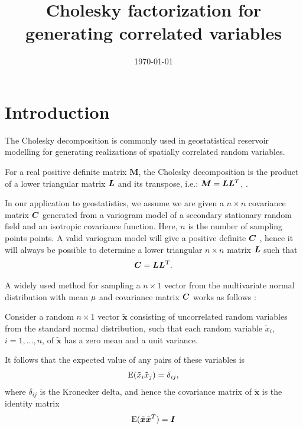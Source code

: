 \documentclass[11pt,a4paper]{amsart}
\newcommand{\mMatrix}{\ensuremath{\boldsymbol{M}}}
\newcommand{\numSamples}{\ensuremath{n}}
\newcommand{\xVar}{\ensuremath{\tilde{x}}}
\newcommand{\xVec}{\ensuremath{\tilde{\boldsymbol{x}}}}
\begin{document}
\title{Cholesky factorization for generating correlated variables}
\date{\today}
\maketitle
\section{Introduction}
The Cholesky decomposition is commonly used in geostatistical reservoir modelling for
generating realizations of spatially correlated random variables.

For a real positive definite matrix $\mMatrix$, the Cholesky decomposition is
the product of a lower triangular matrix $\boldsymbol{L}$ and its
transpose, i.e.: $\mMatrix = \cholMatrix\cholMatrix^T$, \cite{gol96:mat}.

In our application to geostatistics, we assume we are given a
$\numSamples\times \numSamples$ covariance matrix
$\boldsymbol{C}$ generated from a variogram model of a secondary stationary random
field and an isotropic covariance function.
Here, $\numSamples$ is the number of
sampling points points. A valid variogram model will give a
positive definite $\boldsymbol{C}$ \cite{chi12:geo},
hence it will always be possible to determine a lower triangular
$\numSamples\times \numSamples$ matrix $\boldsymbol{L}{}$ such that
\begin{align}
  \label{eq:6}
  \boldsymbol{C} = \boldsymbol{L} \boldsymbol{L}^{\text{T}}. 
\end{align}

A widely used method for sampling a $\numSamples \times 1$ vector
from the multivariate normal distribution with mean $\mu$
  and covariance matrix $\boldsymbol{C}$ works as follows \cite{gen09:com}:

Consider a random $\numSamples\times 1$ vector $\xVec$ 
consisting of uncorrelated random variables
from the standard normal distribution, such that each random variable
$\xVar_i$, $i = 1, \ldots, \numSamples$, of $\xVec$
has a zero mean and a unit variance.

It follows that the expected value of any pairs of these variables is
\begin{align}
  \label{eq:3}
  \expectedValue(\xVar_i\xVar_j)=\delta_{ij},
\end{align}
where $\delta_{ij}$ is the Kronecker delta,
and hence the covariance matrix of $\xVec$ is the identity matrix
\begin{align}
  \label{eq:4}
  \expectedValue(\xVec\xVec^T) = \identityMatrix
\end{align}
\end{document}
